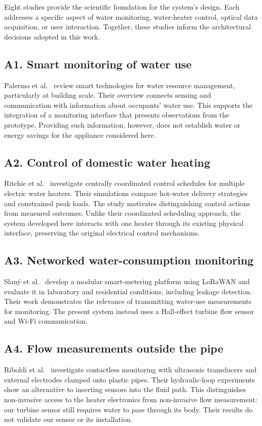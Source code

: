 Eight studies provide the scientific foundation for the system's design.
Each addresses a specific aspect of water monitoring, water-heater control,
optical data acquisition, or user interaction.
Together, these studies inform the architectural decisions adopted in this work.

\subsection*{A1. Smart monitoring of water use}
Palermo et al.~\cite{palermo2022} review smart technologies for water resource management,
particularly at building scale. Their overview connects sensing and communication with
information about occupants' water use. This supports the integration of a monitoring
interface that presents observations from the prototype. Providing such information,
however, does not establish water or energy savings for the appliance considered here.

\subsection*{A2. Control of domestic water heating}
Ritchie et al.~\cite{ritchie2022} investigate centrally coordinated control schedules for
multiple electric water heaters. Their simulations compare hot-water delivery strategies
and constrained peak loads. The study motivates distinguishing control actions from
measured outcomes. Unlike their coordinated scheduling approach, the system developed
here interacts with one heater through its existing physical interface, preserving the
original electrical control mechanisms.

\subsection*{A3. Networked water-consumption monitoring}
Slan\'{y} et al.~\cite{slany2020} develop a modular smart-metering platform using
LoRaWAN and evaluate it in laboratory and residential conditions, including leakage detection.
Their work demonstrates the relevance of transmitting water-use measurements for monitoring.
The present system instead uses a Hall-effect turbine flow sensor and Wi-Fi communication.


\subsection*{A4. Flow measurements outside the pipe}
Riboldi et al.~\cite{riboldi2023} investigate contactless monitoring with ultrasonic
transducers and external electrodes clamped onto plastic pipes. Their hydraulic-loop
experiments show an alternative to inserting sensors into the fluid path. This distinguishes
non-invasive access to the heater electronics from non-invasive flow measurement:
our turbine sensor still requires water to pass through its body. Their results do not
validate our sensor or its installation.

